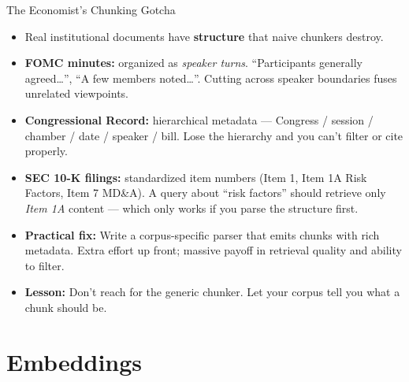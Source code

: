 \begin{frame}{The Economist's Chunking Gotcha}
\begin{itemize}
\item Real institutional documents have \textbf{structure} that naive chunkers destroy.

\medskip
\item \textbf{FOMC minutes:} organized as \emph{speaker turns}. ``Participants generally agreed\dots'', ``A few members noted\dots''. Cutting across speaker boundaries fuses unrelated viewpoints.

\medskip
\item \textbf{Congressional Record:} hierarchical metadata --- Congress / session / chamber / date / speaker / bill. Lose the hierarchy and you can't filter or cite properly.

\medskip
\item \textbf{SEC 10-K filings:} standardized item numbers (Item 1, Item 1A Risk Factors, Item 7 MD\&A). A query about ``risk factors'' should retrieve only \emph{Item 1A} content --- which only works if you parse the structure first.

\medskip
\item \textbf{Practical fix:} Write a corpus-specific parser that emits chunks with rich metadata. Extra effort up front; massive payoff in retrieval quality and ability to filter.

\medskip
\item \textbf{Lesson:} Don't reach for the generic chunker. Let your corpus tell you what a chunk should be.
\end{itemize}
\end{frame}

\section{Embeddings}

